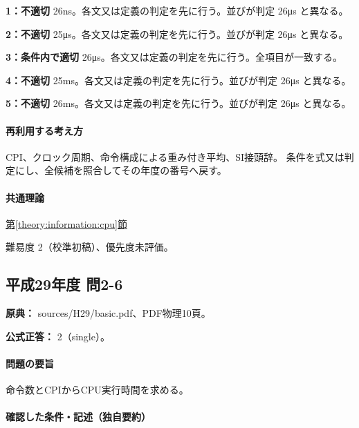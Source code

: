 \noindent\textbf{1：不適切} 26ns。各文又は定義の判定を先に行う。並びが判定 26μs と異なる。\par

\noindent\textbf{2：不適切} 25μs。各文又は定義の判定を先に行う。並びが判定 26μs と異なる。\par

\noindent\textbf{3：条件内で適切} 26μs。各文又は定義の判定を先に行う。全項目が一致する。\par

\noindent\textbf{4：不適切} 25ms。各文又は定義の判定を先に行う。並びが判定 26μs と異なる。\par

\noindent\textbf{5：不適切} 26ms。各文又は定義の判定を先に行う。並びが判定 26μs と異なる。\par

\paragraph{再利用する考え方} CPI、クロック周期、命令構成による重み付き平均、SI接頭辞。 条件を式又は判定にし、全候補を照合してその年度の番号へ戻す。

\paragraph{共通理論} \hyperref[theory:information:cpu]{第\ref*{theory:information:cpu}節}

\par 難易度 2（校準初稿）、優先度未評価。

\subsection{平成29年度 問2-6}
\label{q:h29-reg-basic-2-6}

\noindent\textbf{原典：} sources/H29/basic.pdf、PDF物理10頁。

\textbf{公式正答：} 2（single）。

\paragraph{問題の要旨} 命令数とCPIからCPU実行時間を求める。

\paragraph{確認した条件・記述（独自要約）}\mbox{}\par

